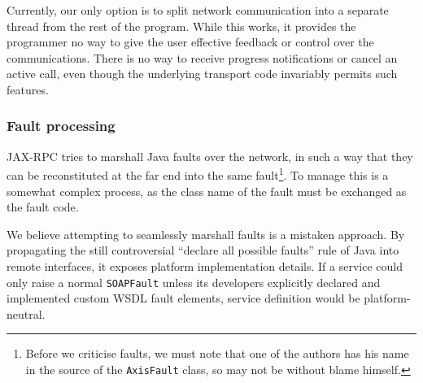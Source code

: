Currently, our only option is to split network communication into a
separate thread from the rest of the program. While this works, it
provides the programmer no way to give the user effective feedback or
control over the communications. There is no way to receive progress
notifications or cancel an active call, even though the underlying
transport code invariably permits such features.


\subsubsection{Fault processing}
\label{objections:soap-not-rmi:faults}

JAX-RPC tries to marshall Java faults over the network, in such a way
that they can be reconstituted at the far end into the same
fault\footnote{Before we criticise faults, we must note that one of
the authors has his name in the source of the {\tt AxisFault} class,
so may not be without blame himself.}. To manage this is a somewhat
complex process, as the class name of the fault must be exchanged as
the fault code.

We believe attempting to seamlessly marshall faults is a mistaken
approach.  By propagating the still controversial ``declare all
possible faults'' rule of Java into remote interfaces, it exposes
platform implementation details. If a service could only raise a
normal {\tt SOAPFault} unless its developers explicitly declared and
implemented custom WSDL fault elements, service definition would be
platform-neutral.



